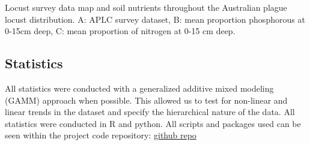 \documentclass[
]{article}
\begin{document}
\begin{fig}


\caption{\label{fig-spatial-modeling-env-map}Locust survey data map and
soil nutrients throughout the Australian plague locust distribution. A:
APLC survey dataset, B: mean proportion phosphorous at 0-15cm deep, C:
mean proportion of nitrogen at 0-15 cm deep.}

\end{fig}%

\subsection{Statistics}\label{statistics}

All statistics were conducted with a generalized additive mixed modeling
(GAMM) approach when possible. This allowed us to test for non-linear
and linear trends in the dataset and specify the hierarchical nature of
the data. All statistics were conducted in R and python. All scripts and
packages used can be seen within the project code repository:
\href{./path/to/repo}{github repo}
\end{document}
